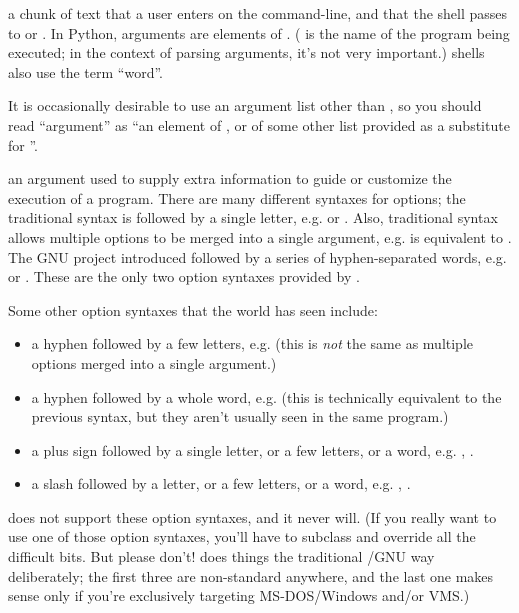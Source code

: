 \begin{definitions}
a chunk of text that a user enters on the command-line, and that the
shell passes to  or .  In
Python, arguments are elements of
. ( is the name of the program
being executed; in the context of parsing arguments, it's not very
important.)  \UNIX{} shells also use the term ``word''.

It is occasionally desirable to use an argument list other than
, so you should read ``argument'' as ``an element of
, or of some other list provided as a substitute for
''.

  an argument used to supply extra information to guide or customize
  the execution of a program.  There are many different syntaxes for
  options; the traditional \UNIX{} syntax is \programopt{-} followed by a
  single letter, e.g.  or .  Also,
  traditional \UNIX{} syntax allows multiple options to be merged into a
  single argument, e.g.   is equivalent to
  .  The GNU project introduced \longprogramopt{}
  followed by a series of hyphen-separated words,
  e.g.  or .  These are
  the only two option syntaxes provided by .

  Some other option syntaxes that the world has seen include:

\begin{itemize}
\item a hyphen followed by a few letters, e.g.  (this is
      \emph{not} the same as multiple options merged into a single
      argument.)
\item a hyphen followed by a whole word, e.g.  (this is
      technically equivalent to the previous syntax, but they aren't
      usually seen in the same program.)
\item a plus sign followed by a single letter, or a few letters,
      or a word, e.g. , .
\item a slash followed by a letter, or a few letters, or a word, e.g.
      , .
\end{itemize}

 does not support these option syntaxes, and it never
will.  (If you really want to use one of those option syntaxes, you'll
have to subclass  and override all the difficult
bits.  But please don't!   does things the traditional
\UNIX/GNU way deliberately; the first three are non-standard anywhere,
and the last one makes sense only if you're exclusively targeting
MS-DOS/Windows and/or VMS.)


\end{definitions}
